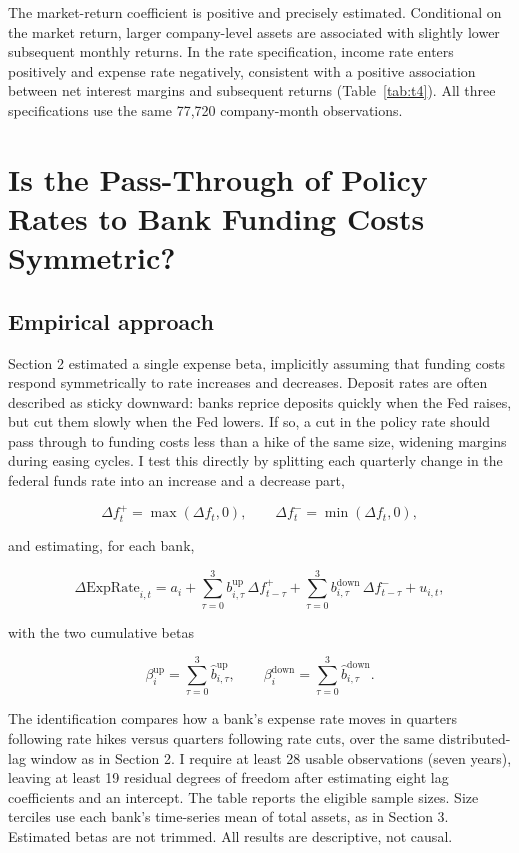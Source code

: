 \documentclass[11pt]{article}
\begin{document}
The market-return coefficient is positive and precisely estimated. Conditional
on the market return, larger company-level assets are associated with slightly
lower subsequent monthly returns. In the rate specification, income rate
enters positively and expense rate negatively, consistent with a positive
association between net interest margins and subsequent returns
(Table~\ref{tab:t4}). All three specifications use the same 77,720
company-month observations.

\section{Is the Pass-Through of Policy Rates to Bank Funding Costs Symmetric?}

\subsection{Empirical approach}
Section 2 estimated a single expense beta, implicitly assuming that funding costs
respond symmetrically to rate increases and decreases. Deposit rates are often
described as sticky downward: banks reprice deposits quickly when the Fed
raises, but cut them slowly when the Fed lowers. If so, a cut in the policy
rate should pass through to funding costs less than a hike of the same size,
widening margins during easing cycles. I test this directly by splitting each
quarterly change in the federal funds rate into an increase and a decrease
part,

\begin{equation}
\Delta f^{+}_t=\max(\Delta f_t,0),\qquad
\Delta f^{-}_t=\min(\Delta f_t,0),
\end{equation}

and estimating, for each bank,

\begin{equation}
\Delta \text{ExpRate}_{i,t}=a_i+\sum_{\tau=0}^{3}b^{\text{up}}_{i,\tau}\,\Delta f^{+}_{t-\tau}
+\sum_{\tau=0}^{3}b^{\text{down}}_{i,\tau}\,\Delta f^{-}_{t-\tau}+u_{i,t},
\end{equation}

with the two cumulative betas

\begin{equation}
\beta^{\text{up}}_{i}=\sum_{\tau=0}^{3}\widehat{b}^{\text{up}}_{i,\tau},\qquad
\beta^{\text{down}}_{i}=\sum_{\tau=0}^{3}\widehat{b}^{\text{down}}_{i,\tau}.
\end{equation}

The identification compares how a bank's expense rate moves in quarters
following rate hikes versus quarters following rate cuts, over the same
distributed-lag window as in Section 2. I require at least 28 usable observations
(seven years), leaving at least 19 residual degrees of freedom after estimating
eight lag coefficients and an intercept. The table reports the eligible sample
sizes. Size terciles use each bank's time-series mean of total assets, as in
Section 3. Estimated betas are not trimmed. All results are descriptive, not causal.
\end{document}
